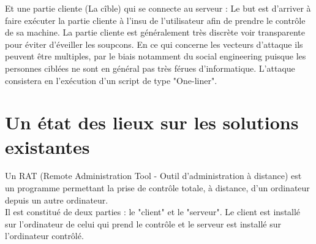 \documentclass[a4paper]{article}
\begin{document}
Et une partie cliente (La cîble) qui se connecte au serveur : Le but est d'arriver à faire exécuter la partie cliente à l'insu de l'utilisateur afin de  prendre le contrôle de sa machine. La partie cliente est généralement très discrète voir transparente pour éviter d'éveiller les soupcons. En ce qui concerne les vecteurs d'attaque ils peuvent être multiples, par le biais notamment du social engineering puisque les personnes ciblées ne sont en général pas très férues d'informatique. L'attaque consistera en l'exécution d'un script de type "One-liner".

\newpage

\section{Un état des lieux sur les solutions existantes}
Un RAT (Remote Administration Tool - Outil d'administration à distance) est un programme permettant la prise de contrôle totale, à distance, d'un ordinateur depuis un autre ordinateur.\\
Il est constitué de deux parties : le "client" et le "serveur". Le client est installé sur l'ordinateur de celui qui prend le contrôle et le serveur est installé sur l'ordinateur contrôlé.
\bigskip
\\
\end{document}
